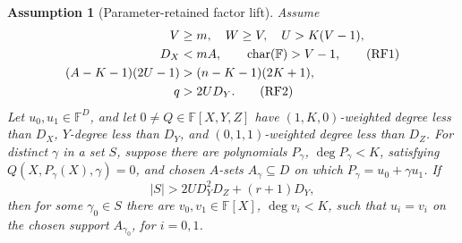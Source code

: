 \documentclass[11pt,a4paper]{amsart}
\numberwithin{equation}{section}
\newtheorem{assumption}[assumption]{Assumption}
\theoremstyle{remark}
\newcommand{\F}{\mathbb F}
\newcommand{\abs}[1]{\lvert #1\rvert}
\begin{document}
\begin{assumption}[Parameter-retained factor lift]
\label{ass:retained-factor-lift}
Assume
\begin{align}
 V&\ge m,\quad W\ge V,\quad U>K(V-1),\notag\\
 D_X&<mA,\qquad \operatorname{char}(\F)>V-1,          \tag{RF1}\\
 (A-K-1)(2U-1)&>(n-K-1)(2K+1),\notag\\
 q&>2UD_Y.                                           \tag{RF2}
\end{align}
Let \(u_0,u_1\in\F^D\), and let \(0\ne Q\in\F[X,Y,Z]\) have
\((1,K,0)\)-weighted degree less than \(D_X\), \(Y\)-degree less
than \(D_Y\), and \((0,1,1)\)-weighted degree less than \(D_Z\).
For distinct \(\gamma\) in a set \(S\), suppose there are polynomials
\(P_\gamma\), \(\deg P_\gamma<K\), satisfying
\(Q(X,P_\gamma(X),\gamma)=0\), and chosen \(A\)-sets
\(A_\gamma\subseteq D\) on which
\(P_\gamma=u_0+\gamma u_1\).  If
\[
 \abs S>2U D_Y^2D_Z+(r+1)D_Y,                     \tag{RF3}
 \label{eq:retained-factor-threshold}
\]
then for some \(\gamma_0\in S\) there are
\(v_0,v_1\in\F[X]\), \(\deg v_i<K\), such that
\(u_i=v_i\) on the chosen support \(A_{\gamma_0}\), for
\(i=0,1\).
\end{assumption}
\end{document}
